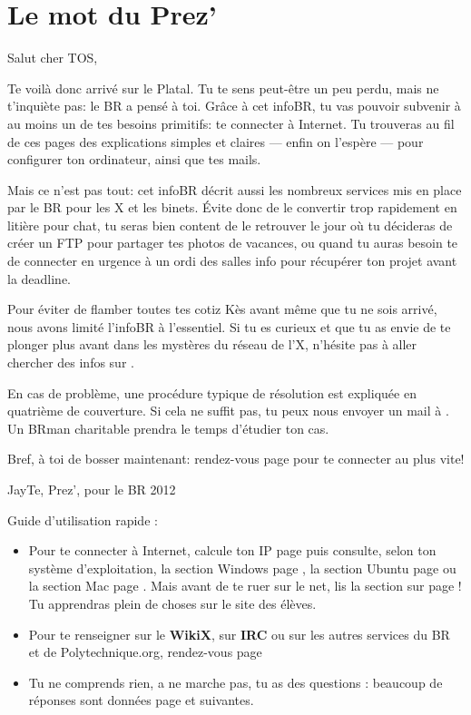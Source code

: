 \thispagestyle{empty}

\section*{Le mot du Prez'}

\vspace{1em}

Salut cher TOS,
\vspace{0.5em}

Te voilà donc arrivé sur le Platal. Tu te sens peut-être un peu perdu, mais ne t'inquiète pas: le BR a pensé à toi. Grâce à cet infoBR, tu vas pouvoir subvenir à au moins un de tes besoins primitifs: te connecter à Internet. Tu trouveras au fil de ces pages des explications simples et claires --- enfin on l'espère --- pour configurer ton ordinateur, ainsi que tes mails.

Mais ce n'est pas tout: cet infoBR décrit aussi les nombreux services mis en place par le BR pour les X et les binets. Évite donc de le convertir trop rapidement en litière pour chat, tu seras bien content de le retrouver le jour où tu décideras de créer un FTP pour partager tes photos de vacances, ou quand tu auras besoin te de connecter en urgence à un ordi des salles info pour récupérer ton projet avant la deadline.

Pour éviter de flamber toutes tes cotiz Kès avant même que tu ne sois arrivé, nous avons limité l'infoBR à l'essentiel. Si tu es curieux et que tu as envie de te plonger plus avant dans les mystères du réseau de l'X, n'hésite pas à aller chercher des infos sur .

\vspace{1em}
En cas de problème, une procédure typique de résolution est expliquée en quatrième de couverture. Si cela ne suffit pas, tu peux nous envoyer un mail à . Un BRman charitable prendra le temps d'étudier ton cas.

Bref, à toi de bosser maintenant: rendez-vous page \pageref{ip} pour te connecter au plus vite!

\vspace{2.5em}
\hfill JayTe, Prez', pour le BR 2012


\vfill


Guide d'utilisation rapide :
\begin{itemize}
\item Pour te connecter à Internet, calcule ton IP page \pageref{ip} puis consulte, selon ton système d'exploitation, la section Windows page \pageref{windows}, la section Ubuntu page \pageref{ubuntu} ou la section Mac page \pageref{mac}. Mais avant de te ruer sur le net, lis la section sur \fkz page \pageref{services}! Tu apprendras plein de choses sur le site des élèves.
\item Pour te renseigner sur le \textbf{WikiX}, sur \textbf{IRC} ou sur les autres services du BR et de Polytechnique.org, rendez-vous page \pageref{services}
\item Tu ne comprends rien, a ne marche pas, tu as des questions : beaucoup de réponses sont données page \pageref{faq} et suivantes.

\end{itemize}

